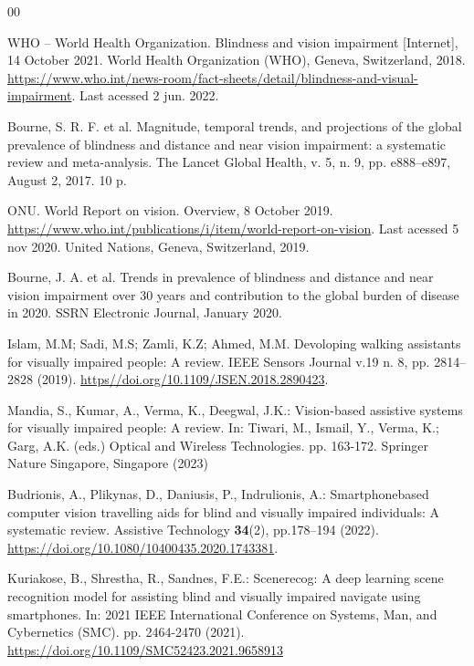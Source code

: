 \documentclass[preprint,12pt]{elsarticle}
\begin{document}
\begin{thebibliography}{00}


WHO – World Health Organization. Blindness and vision impairment [Internet], 14 October 2021. World Health Organization (WHO), Geneva, Switzerland, 2018. \url{https://www.who.int/news-room/fact-sheets/detail/blindness-and-visual-impairment}. Last acessed 2 jun. 2022.

Bourne, S. R. F. et al. Magnitude, temporal trends, and projections of the global prevalence of blindness and distance and near vision impairment: a systematic review and meta-analysis. The Lancet Global Health, v. 5, n. 9, pp. e888--e897, August 2, 2017. 10 p.

ONU. World Report on vision. Overview, 8 October 2019. \url{https://www.who.int/publications/i/item/world-report-on-vision}. Last acessed 5 nov 2020. United Nations, Geneva, Switzerland, 2019.

Bourne, J. A. et al. Trends in prevalence of blindness and distance and near vision impairment over 30 years and contribution to the global burden of disease in 2020. SSRN Electronic Journal, January 2020.

Islam, M.M; Sadi, M.S; Zamli, K.Z; Ahmed, M.M. Devoloping walking assistants for visually impaired people: A review. IEEE Sensors Journal v.19 n. 8, pp. 2814--2828 (2019). \url{https//doi.org/10.1109/JSEN.2018.2890423}.

Mandia, S., Kumar, A., Verma, K., Deegwal, J.K.: Vision-based assistive systems for visually impaired people: A review. In: Tiwari, M., Ismail, Y., Verma, K.; Garg, A.K. (eds.) Optical and Wireless Technologies. pp. 163-172. Springer Nature Singapore, Singapore (2023)

Budrionis, A., Plikynas, D., Daniusis, P., Indrulionis, A.: Smartphonebased computer vision travelling aids for blind and visually impaired individuals: A systematic review. Assistive Technology \textbf{34}(2), pp.178--194 (2022). \url{https://doi.org/10.1080/10400435.2020.1743381}.

Kuriakose, B., Shrestha, R., Sandnes, F.E.: Scenerecog: A deep learning scene recognition model for assisting blind and visually impaired navigate using smartphones. In: 2021 IEEE International Conference on Systems, Man, and Cybernetics (SMC). pp. 2464-2470 (2021). \url{https://doi.org/10.1109/SMC52423.2021.9658913}


\end{thebibliography}
\end{document}
